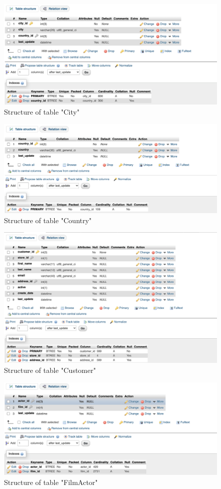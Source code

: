 \documentclass[openany]{article}
\begin{document}
	\begin{figure}[H]
		\includegraphics[width=\textwidth]{table_city_struct}
		\caption{Structure of table "City"}	
	\end{figure}
	\begin{figure}[H]
		\includegraphics[width=\textwidth]{table_country_struct}
		\caption{Structure of table "Country"}	
	\end{figure}
	\begin{figure}[H]
		\includegraphics[width=\textwidth]{table_customer_struct}
		\caption{Structure of table "Customer"}	
	\end{figure}
	\begin{figure}[H]
		\includegraphics[width=\textwidth]{table_filmactor_struct}
		\caption{Structure of table "Film\textunderscore Actor"}	
	\end{figure}
\end{document}
